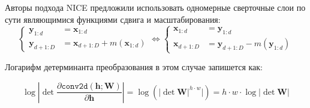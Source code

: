 Авторы подхода NICE предложили использовать одномерные сверточные слои по сути являющимися функциями сдвига и масштабирования:
\begin{equation}
    \begin{cases}
    \mathbf{y}_{1:d} &= \mathbf{x}_{1:d} \\ 
    \mathbf{y}_{d+1:D} &= \mathbf{x}_{d+1:D} + m(\mathbf{x}_{1:d})
    \end{cases}
    \Leftrightarrow 
    \begin{cases}
    \mathbf{x}_{1:d} &= \mathbf{y}_{1:d} \\ 
    \mathbf{x}_{d+1:D} &= \mathbf{y}_{d+1:D} - m(\mathbf{y}_{1:d})
    \end{cases}
\end{equation}

Логарифм детерминанта преобразования в этом случае запишется как:

\begin{equation}
    \log \left\vert\det \frac{\partial\texttt{conv2d}(\mathbf{h}; \mathbf{W})}{\partial\mathbf{h}}\right\vert
    = \log (\vert\det\mathbf{W}\vert^{h \cdot w}\vert) = h \cdot w \cdot \log \vert\det\mathbf{W}\vert
\end{equation}



